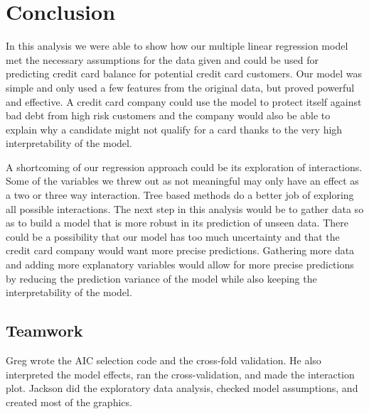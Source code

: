 \documentclass{article}
\begin{document}
\section{Conclusion}
In this analysis we were able to show how our multiple linear regression model met the necessary assumptions for the data given and could be used for predicting credit card balance for potential credit card customers. Our model was simple and only used a few features from the original data, but proved powerful and effective. A credit card company could use the model to protect itself against bad debt from high risk customers and the company would also be able to explain why a candidate might not qualify for a card thanks to the very high interpretability of the model.

A shortcoming of our regression approach could be its exploration of interactions. Some of the variables we threw out as not meaningful may only have an effect as a two or three way interaction. Tree based methods do a better job of exploring all possible interactions. The next step in this analysis would be to gather data so as to build a model that is more robust in its prediction of unseen data. There could be a possibility that our model has too much uncertainty and that the credit card company would want more precise predictions. Gathering more data and adding more explanatory variables would allow for more precise predictions by reducing the prediction variance of the model while also keeping the interpretability of the model. 



\subsection*{Teamwork}
Greg wrote the AIC selection code and the cross-fold validation. He also interpreted the model effects, ran the cross-validation, and made the interaction plot. Jackson did the exploratory data analysis, checked model assumptions, and created most of the graphics.
\end{document}
